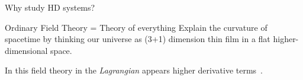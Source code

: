 \begin{frame}{Why study HD systems?}
  \begin{alertblock}{Ordinary Field Theory = Theory of everything}
    \vspace{0.5em}
      Explain the curvature of spacetime by thinking our universe as (3+1)
      dimension thin film in a flat higher-dimensional space.
  \end{alertblock}
  In this field theory in the \emph{Lagrangian} appears \alert{higher
  derivative terms}~\cite{Smilga17}.
\end{frame}
